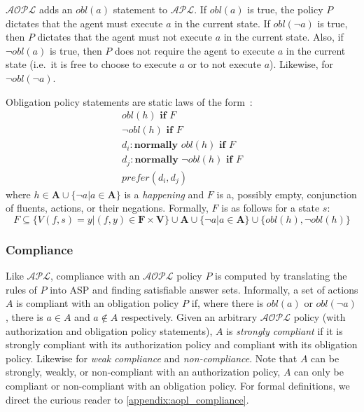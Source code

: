 $\mathcal{AOPL}$ adds an $obl(a)$ statement to $\mathcal{APL}$.
If $obl(a)$ is true, the policy $P$ dictates that the agent must execute $a$ in the current state.
If $obl(\neg a)$ is true, then $P$ dictates that the agent must not execute $a$ in the current state.
Also, if $\neg obl(a)$ is true, then $P$ does not require the agent to execute $a$ in the current state (i.e.~it is free to choose to execute $a$ or to not execute $a$).
Likewise, for $\neg obl(\neg a)$.

\begin{definition}
    Obligation policy statements are static laws of the form~\citep{gelfond_authorization_2008}:
    \begin{gather}
        obl\left(h\right) \textbf{ if } F \\
        \neg obl\left(h\right) \textbf{ if } F \\
        d_i: \textbf{normally } obl(h) \textbf{ if } F \\
        d_j: \textbf{normally } \neg obl(h) \textbf{ if } F \\
        prefer(d_i, d_j)
    \end{gather}
    where $h \in \boldsymbol{A} \cup \{\neg a | a \in \boldsymbol{A}\}$ is a \textit{happening} and $F$ is a, possibly empty, conjunction of fluents, actions, or their negations.
    Formally, $F$ is as follows for a state $s$:
    \begin{equation}
        F\subseteq\{V(f,s)=y | (f, y) \in \boldsymbol{F} \times \boldsymbol{V}\} \cup \boldsymbol{A} \cup \{\neg a | a \in \boldsymbol{A}\} \cup \{obl(h), \neg obl(h)\}
    \end{equation}
\end{definition}

\subsubsection{Compliance}

Like $\mathcal{APL}$, compliance with an $\mathcal{AOPL}$ policy $P$ is computed by translating the rules of $P$ into ASP and finding satisfiable answer sets.
Informally, a set of actions $A$ is compliant with an obligation policy $P$ if, where there is $obl(a)$ or $obl(\neg a)$, there is $a \in A$ and $a \not \in A$ respectively.
Given an arbitrary $\mathcal{AOPL}$ policy (with authorization and obligation policy statements), $A$ is \textit{strongly compliant} if it is strongly compliant with its authorization policy and compliant with its obligation policy.
Likewise for \textit{weak compliance} and \textit{non-compliance}.
Note that $A$ can be strongly, weakly, or non-compliant with an authorization policy, $A$ can only be compliant or non-compliant with an obligation policy.
For formal definitions, we direct the curious reader to \cref{appendix:aopl_compliance}.

